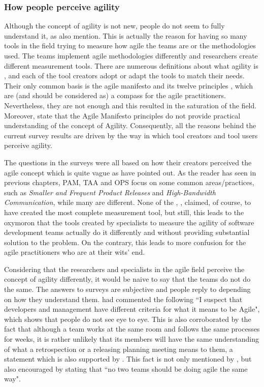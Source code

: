 \subsubsection{How people perceive agility}
Although the concept of agility is not new, people do not seem to fully understand it, as \citet{Wang_Conboy} also mention. This is actually the reason for having so many tools in the field trying to measure how agile the teams are or the methodologies used. The teams implement agile methodologies differently and researchers create different measurement tools. There are numerous definitions about what agility is \cite{Kidd, Kara, Ramesh, agile_manufacturing}, and each of the tool creators adopt or adapt the tools to match their needs. Their only common basis is the agile manifesto \cite{beck2001agile} and its twelve principles \cite{agile_principles}, which are (and should be considered as) a compass for the agile practitioners. Nevertheless, they are not enough and this resulted in the saturation of the field. Moreover, \citet{conboy_fitzgerald} state that the Agile Manifesto principles do not provide practical understanding of the concept of Agility. Consequently, all the reasons behind the current survey results are driven by the way in which tool creators and tool users perceive agility.

The questions in the surveys were all based on how their creators perceived the agile concept which is quite vague as \citet{tsourveloudis} have pointed out. As the reader has seen in previous chapters, \ac{PAM}, \ac{TAA} and \ac{OPS} focus on some common areas/practices, such as  \textit{Smaller and Frequent Product Releases} and \textit{High-Bandwidth Communication}, while many are different. None of the \citet{sventha_dissertation}, \citet{pam}, \citet{Leffingwell} claimed, of course, to have created the most complete measurement tool, but still, this leads to the oxymoron that the tools created by specialists to measure the agility of software development teams actually do it differently and without providing substantial solution to the problem. On the contrary, this leads to more confusion for the agile practitioners who are at their wits' end.

Considering that the researchers and specialists in the agile field perceive the concept of agility differently, it would be naive to say that the teams do not do the same. The answers to surveys are subjective and people reply to depending on how they understand them. \citet{ambler} had commented the following ``I suspect that developers and management have different criteria for what it means to be Agile", which shows that people do not see eye to eye. This is also corroborated by the fact that although a team works at the same room and follows the same processes for weeks, it is rather unlikely that its members will have the same understanding of what a retrospection or a releasing planning meeting means to them, a statement which is also supported by \citet{Williams_Microsoft}. This fact is not only mentioned by \citet{Dave_Thomas}, but also encouraged by stating that ``no two teams should be doing agile the same way".

